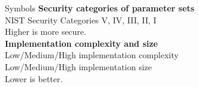 \begin{minipage}[t]{0.4\textwidth}
\begin{algorithmbox}{Symbols}
        {\bfseries Security categories of parameter sets}\\[0.5\baselineskip]
         NIST Security Categories V, IV, III, II, I\\[\baselineskip]

        Higher is more secure.\\[\baselineskip]

        {\bfseries Implementation complexity and size}\\[0.5\baselineskip]
         Low/Medium/High implementation complexity\\
         Low/Medium/High implementation size\\[\baselineskip]
        Lower is better.\\[\baselineskip]


\end{algorithmbox}
\end{minipage}
